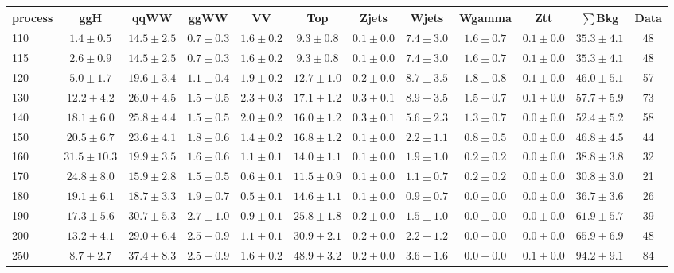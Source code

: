 \begin{table}
{%
 \tiny
 \begin{center}
 \begin{tabular}{l c c c c c c c c c c c }
 \hline
 process & ggH & qqWW & ggWW & VV & Top & Zjets & Wjets & Wgamma & Ztt & $\sum$Bkg & Data \\
 \hline
110 & $1.4\pm0.5$ & $14.5\pm2.5$ & $0.7\pm0.3$ & $1.6\pm0.2$ & $9.3\pm0.8$ & $0.1\pm0.0$ & $7.4\pm3.0$ & $1.6\pm0.7$ & $0.1\pm0.0$ & $35.3\pm4.1$ & 48 \\
115 & $2.6\pm0.9$ & $14.5\pm2.5$ & $0.7\pm0.3$ & $1.6\pm0.2$ & $9.3\pm0.8$ & $0.1\pm0.0$ & $7.4\pm3.0$ & $1.6\pm0.7$ & $0.1\pm0.0$ & $35.3\pm4.1$ & 48 \\
120 & $5.0\pm1.7$ & $19.6\pm3.4$ & $1.1\pm0.4$ & $1.9\pm0.2$ & $12.7\pm1.0$ & $0.2\pm0.0$ & $8.7\pm3.5$ & $1.8\pm0.8$ & $0.1\pm0.0$ & $46.0\pm5.1$ & 57 \\
130 & $12.2\pm4.2$ & $26.0\pm4.5$ & $1.5\pm0.5$ & $2.3\pm0.3$ & $17.1\pm1.2$ & $0.3\pm0.1$ & $8.9\pm3.5$ & $1.5\pm0.7$ & $0.1\pm0.0$ & $57.7\pm5.9$ & 73 \\
140 & $18.1\pm6.0$ & $25.8\pm4.4$ & $1.5\pm0.5$ & $2.0\pm0.2$ & $16.0\pm1.2$ & $0.3\pm0.1$ & $5.6\pm2.3$ & $1.3\pm0.7$ & $0.0\pm0.0$ & $52.4\pm5.2$ & 58 \\
150 & $20.5\pm6.7$ & $23.6\pm4.1$ & $1.8\pm0.6$ & $1.4\pm0.2$ & $16.8\pm1.2$ & $0.1\pm0.0$ & $2.2\pm1.1$ & $0.8\pm0.5$ & $0.0\pm0.0$ & $46.8\pm4.5$ & 44 \\
160 & $31.5\pm10.3$ & $19.9\pm3.5$ & $1.6\pm0.6$ & $1.1\pm0.1$ & $14.0\pm1.1$ & $0.1\pm0.0$ & $1.9\pm1.0$ & $0.2\pm0.2$ & $0.0\pm0.0$ & $38.8\pm3.8$ & 32 \\
170 & $24.8\pm8.0$ & $15.9\pm2.8$ & $1.5\pm0.5$ & $0.6\pm0.1$ & $11.5\pm0.9$ & $0.1\pm0.0$ & $1.1\pm0.7$ & $0.2\pm0.2$ & $0.0\pm0.0$ & $30.8\pm3.0$ & 21 \\
180 & $19.1\pm6.1$ & $18.7\pm3.3$ & $1.9\pm0.7$ & $0.5\pm0.1$ & $14.6\pm1.1$ & $0.1\pm0.0$ & $0.9\pm0.7$ & $0.0\pm0.0$ & $0.0\pm0.0$ & $36.7\pm3.6$ & 26 \\
190 & $17.3\pm5.6$ & $30.7\pm5.3$ & $2.7\pm1.0$ & $0.9\pm0.1$ & $25.8\pm1.8$ & $0.2\pm0.0$ & $1.5\pm1.0$ & $0.0\pm0.0$ & $0.0\pm0.0$ & $61.9\pm5.7$ & 39 \\
200 & $13.2\pm4.1$ & $29.0\pm6.4$ & $2.5\pm0.9$ & $1.1\pm0.1$ & $30.9\pm2.1$ & $0.2\pm0.0$ & $2.2\pm1.2$ & $0.0\pm0.0$ & $0.0\pm0.0$ & $65.9\pm6.9$ & 48 \\
250 & $8.7\pm2.7$ & $37.4\pm8.3$ & $2.5\pm0.9$ & $1.6\pm0.2$ & $48.9\pm3.2$ & $0.2\pm0.0$ & $3.6\pm1.6$ & $0.0\pm0.0$ & $0.1\pm0.0$ & $94.2\pm9.1$ & 84 \\

\end{tabular}
\end{center}}
\end{table}

